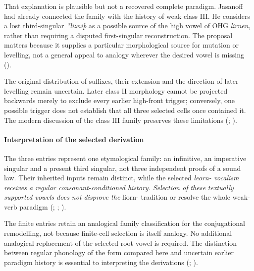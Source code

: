 \documentclass[
  british,
  a4paper,
]{article}
\begin{document}
That explanation is plausible but not a recovered complete paradigm.
Jasanoff had already connected the family with the history of weak class
III. He considers a lost third-singular \emph{*lizniþ} as a possible
source of the high vowel of OHG \emph{lirnēn}, rather than requiring a
disputed first-singular reconstruction. The proposal matters because it
supplies a particular morphological source for mutation or levelling,
not a general appeal to analogy wherever the desired vowel is missing
().

The original distribution of suffixes, their extension and the direction
of later levelling remain uncertain. Later class II morphology cannot be
projected backwards merely to exclude every earlier high-front trigger;
conversely, one possible trigger does not establish that all three
selected cells once contained it. The modern discussion of the class III
family preserves these limitations (; ).

\paragraph{Interpretation of the selected
derivation}\label{interpretation-of-the-selected-derivation}

The three entries represent one etymological family: an infinitive, an
imperative singular and a present third singular, not three independent
proofs of a sound law. Their inherited inputs remain distinct, while the
selected \emph{leorn- vocalism receives a regular consonant-conditioned
history. Selection of these textually supported vowels does not disprove
the }liorn- tradition or resolve the whole weak-verb paradigm
(;
;
).

The finite entries retain an analogical family classification for the
conjugational remodelling, not because finite-cell selection is itself
analogy. No additional analogical replacement of the selected root vowel
is required. The distinction between regular phonology of the form
compared here and uncertain earlier paradigm history is essential to
interpreting the derivations (; ).
\end{document}
